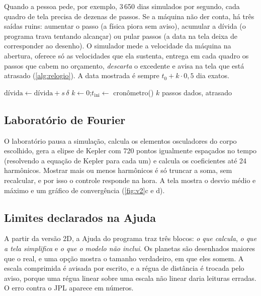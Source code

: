 Quando a pessoa pede, por exemplo, 3\,650 dias simulados por segundo, cada quadro de tela precisa de dezenas de passos. Se a máquina não der conta, há três saídas ruins: aumentar o passo (a física piora sem aviso), acumular a dívida (o programa trava tentando alcançar) ou pular passos (a data na tela deixa de corresponder ao desenho). O simulador mede a velocidade da máquina na abertura, oferece só as velocidades que ela sustenta, entrega em cada quadro os passos que cabem no orçamento, \emph{descarta} o excedente e avisa na tela que está atrasado (\autoref{alg:relogio}). A data mostrada é sempre $t_0 + k\cdot0{,}5$ dia exatos.

\begin{algorithm}[htb]
  \caption{Avanço do relógio dentro do orçamento do quadro (simplificado)}\label{alg:relogio}
  $\text{dívida} \leftarrow \text{dívida} + s\,\delta$\;
  $k \leftarrow 0$;\quad $t_\text{ini} \leftarrow$ cronômetro()\;
  \Return $k$ passos dados, atrasado\;
\end{algorithm}

\subsection{Laboratório de Fourier}

O laboratório pausa a simulação, calcula os elementos osculadores do corpo escolhido, gera a elipse de Kepler com 720 pontos igualmente espaçados no tempo (resolvendo a equação de Kepler para cada um) e calcula os coeficientes até 24 harmônicos. Mostrar mais ou menos harmônicos é só truncar a soma, sem recalcular, e por isso o controle responde na hora. A tela mostra o desvio médio e máximo e um gráfico de convergência (\autoref{fig:v2}c e d).

\subsection{Limites declarados na Ajuda}

A partir da versão 2D, a Ajuda do programa traz três blocos: \emph{o que calcula}, \emph{o que a tela simplifica} e \emph{o que o modelo não inclui}. Os planetas são desenhados maiores que o real, e uma opção mostra o tamanho verdadeiro, em que eles somem. A escala comprimida é avisada por escrito, e a régua de distância é trocada pelo aviso, porque uma régua linear sobre uma escala não linear daria leituras erradas. O erro contra o JPL aparece em números.

